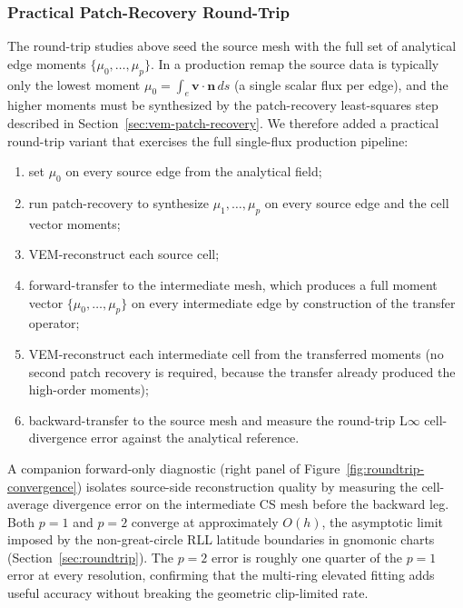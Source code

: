 \documentclass[11pt]{article}
\begin{document}
\subsubsection*{Practical Patch-Recovery Round-Trip}
\label{sec:practical-roundtrip}

The round-trip studies above seed the source mesh with the full set of
analytical edge moments \(\{\mu_0,\ldots,\mu_p\}\).  In a production remap the
source data is typically only the lowest moment \(\mu_0=\int_e \mathbf{v}\cdot
\mathbf{n}\,ds\) (a single scalar flux per edge), and the higher moments must be
synthesized by the patch-recovery least-squares step described in
Section~\ref{sec:vem-patch-recovery}.  We therefore added a practical
round-trip variant that exercises the full single-flux production pipeline:
\begin{enumerate}
  \item set \(\mu_0\) on every source edge from the analytical field;
  \item run patch-recovery to synthesize \(\mu_1,\ldots,\mu_p\) on every source
        edge and the cell vector moments;
  \item VEM-reconstruct each source cell;
  \item forward-transfer to the intermediate mesh, which produces a full
        moment vector \(\{\mu_0,\ldots,\mu_p\}\) on every intermediate edge by
        construction of the transfer operator;
  \item VEM-reconstruct each intermediate cell from the transferred moments
        (no second patch recovery is required, because the transfer already
        produced the high-order moments);
  \item backward-transfer to the source mesh and measure the round-trip
        L\(\infty\) cell-divergence error against the analytical reference.
\end{enumerate}

A companion forward-only diagnostic (right panel of
Figure~\ref{fig:roundtrip-convergence}) isolates source-side reconstruction
quality by measuring the cell-average divergence error on the intermediate CS
mesh before the backward leg.  Both \(p=1\) and \(p=2\) converge at
approximately \(O(h)\), the asymptotic limit imposed by the non-great-circle
RLL latitude boundaries in gnomonic charts (Section~\ref{sec:roundtrip}).
The \(p=2\) error is roughly one quarter of the \(p=1\) error at every
resolution, confirming that the multi-ring elevated fitting adds useful
accuracy without breaking the geometric clip-limited rate.
\end{document}
